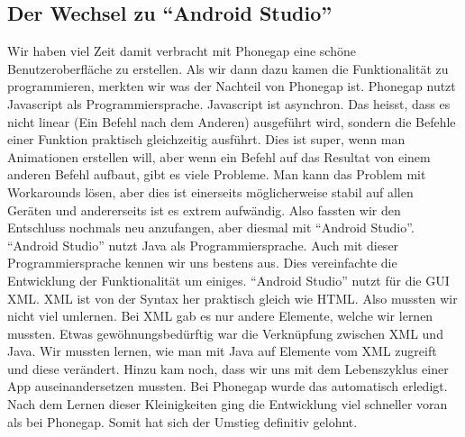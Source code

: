 \subsection{Der Wechsel zu "`Android Studio"'}
Wir haben viel Zeit damit verbracht mit Phonegap eine schöne Benutzeroberfläche zu erstellen. Als wir dann dazu kamen die Funktionalität zu programmieren, merkten wir was der Nachteil von Phonegap ist. Phonegap nutzt Javascript als Programmiersprache. Javascript ist asynchron. Das heisst, dass es nicht linear (Ein Befehl nach dem Anderen) ausgeführt wird, sondern die Befehle einer Funktion praktisch gleichzeitig ausführt. Dies ist super, wenn man Animationen erstellen will, aber wenn ein Befehl auf das Resultat von einem anderen Befehl aufbaut, gibt es viele Probleme. Man kann das Problem mit Workarounds lösen, aber dies ist einerseits möglicherweise stabil auf allen Geräten und andererseits ist es extrem aufwändig. Also fassten wir den Entschluss nochmals neu anzufangen, aber diesmal mit "`Android Studio"'. "`Android Studio"' nutzt Java als Programmiersprache. Auch mit dieser Programmiersprache kennen wir uns bestens aus. Dies vereinfachte die Entwicklung der Funktionalität um einiges. "`Android Studio"' nutzt für die GUI XML. XML ist von der Syntax her praktisch gleich wie HTML. Also mussten wir nicht viel umlernen. Bei XML gab es nur andere Elemente, welche wir lernen mussten. Etwas gewöhnungsbedürftig war die Verknüpfung zwischen XML und Java. Wir mussten lernen, wie man mit Java auf Elemente vom XML zugreift und diese verändert. Hinzu kam noch, dass wir uns mit dem Lebenszyklus einer App auseinandersetzen mussten. Bei Phonegap wurde das automatisch erledigt. Nach dem Lernen dieser Kleinigkeiten ging die Entwicklung viel schneller voran als bei Phonegap. Somit hat sich der Umstieg definitiv gelohnt. 